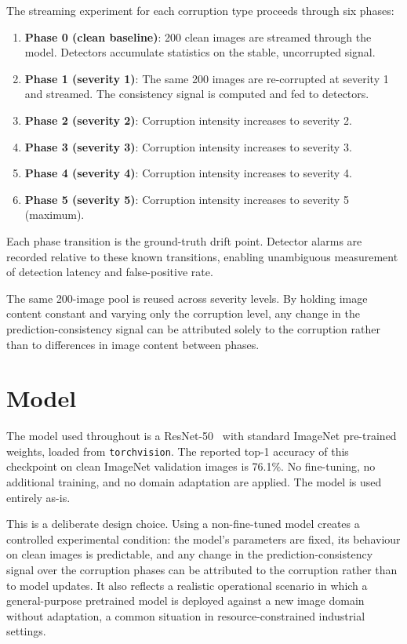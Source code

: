 The streaming experiment for each corruption type proceeds through six phases:

\begin{enumerate}
  \item \textbf{Phase 0 (clean baseline)}: 200 clean images are streamed through the model. Detectors accumulate statistics on the stable, uncorrupted signal.
  \item \textbf{Phase 1 (severity 1)}: The same 200 images are re-corrupted at severity 1 and streamed. The consistency signal is computed and fed to detectors.
  \item \textbf{Phase 2 (severity 2)}: Corruption intensity increases to severity 2.
  \item \textbf{Phase 3 (severity 3)}: Corruption intensity increases to severity 3.
  \item \textbf{Phase 4 (severity 4)}: Corruption intensity increases to severity 4.
  \item \textbf{Phase 5 (severity 5)}: Corruption intensity increases to severity 5 (maximum).
\end{enumerate}

Each phase transition is the ground-truth drift point. Detector alarms are recorded relative to these known transitions, enabling unambiguous measurement of detection latency and false-positive rate.

The same 200-image pool is reused across severity levels. By holding image content constant and varying only the corruption level, any change in the prediction-consistency signal can be attributed solely to the corruption rather than to differences in image content between phases.

\section{Model}
\label{sec:model}

The model used throughout is a ResNet-50~\autocite{He2016} with standard ImageNet pre-trained weights, loaded from \texttt{torchvision}. The reported top-1 accuracy of this checkpoint on clean ImageNet validation images is 76.1\%. No fine-tuning, no additional training, and no domain adaptation are applied. The model is used entirely as-is.

This is a deliberate design choice. Using a non-fine-tuned model creates a controlled experimental condition: the model's parameters are fixed, its behaviour on clean images is predictable, and any change in the prediction-consistency signal over the corruption phases can be attributed to the corruption rather than to model updates. It also reflects a realistic operational scenario in which a general-purpose pretrained model is deployed against a new image domain without adaptation, a common situation in resource-constrained industrial settings.

